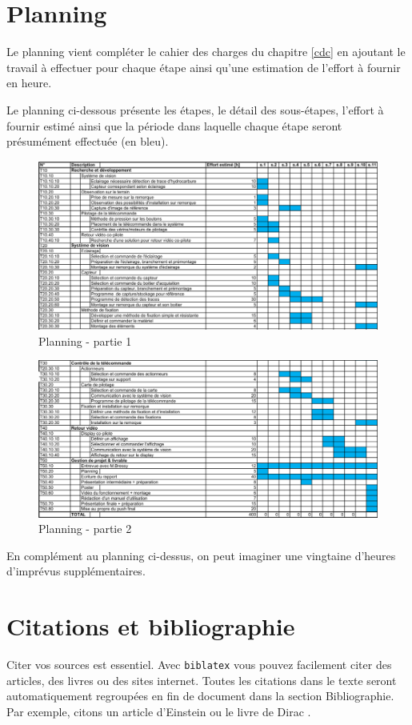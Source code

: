 \section{Planning}
Le planning vient compléter le cahier des charges du chapitre \ref{cdc} en ajoutant le travail à effectuer pour chaque étape ainsi qu'une estimation
de l'effort à fournir en heure.

Le planning ci-dessous présente les étapes, le détail des sous-étapes, l'effort à fournir estimé ainsi que la période dans laquelle chaque étape seront présumément effectuée (en bleu).
\begin{figure}[H]
    \centering
    \includegraphics[width=15cm, angle=90]{assets/figures/planning1.png}
    \caption{Planning - partie 1}
\end{figure}
\newpage
\begin{figure}[H]
    \centering
    \includegraphics[width=15cm, angle=90]{assets/figures/planning2.png}
    \caption{Planning - partie 2}
\end{figure}

En complément au planning ci-dessus, on peut imaginer une vingtaine d'heures d'imprévus supplémentaires.
\iffalse
    \section{Citations et bibliographie}
    Citer vos sources est essentiel. Avec \texttt{biblatex} vous pouvez facilement citer des articles, des livres ou des sites internet. Toutes les citations dans le texte seront automatiquement regroupées en fin de document dans la section \guillemotleft Bibliographie\guillemotright. Par exemple, citons un article d'Einstein \cite{einstein} ou le livre de Dirac \cite{dirac}.
    
